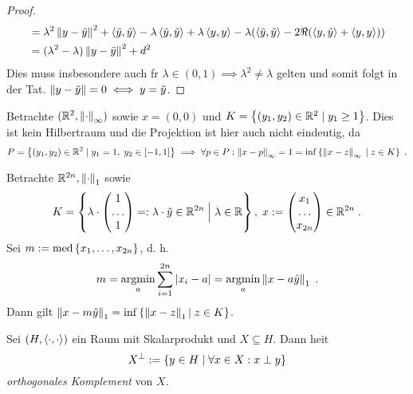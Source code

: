 \begin{proof}
\begin{align*}
	&= \lambda^2 \left\lVert y-\tilde y\right\rVert^2 + \left\langle\tilde y, \tilde y\right\rangle - \lambda \left\langle\tilde y, \tilde y\right\rangle + \lambda \left\langle y, y\right\rangle - \lambda (\left\langle\tilde y, \tilde y\right\rangle -2 \Re(\left\langle y,\tilde y\right\rangle + \left\langle y,y\right\rangle)) \\
	& = (\lambda^2 - \lambda) \left\lVert y-\tilde y\right\rVert^2 + d^2 
	\end{align*}
	Dies muss insbesondere auch f\us r \(\lambda \in (0,1) \implies \lambda^2 \neq \lambda\) gelten und somit folgt in der Tat. \(\left\lVert y-\tilde y\right\rVert = 0 \iff y = \tilde y\).
	\end{proof}
	
	\begin{ex}
		Betrachte \((\mathbb{R}^2, \left\lVert\cdot\right\rVert_\infty)\) sowie \(x = (0,0)\) und \(K = \left\{(y_1, y_2) \in \mathbb{R}^2\;\vert\; y_1 \geq 1\right\}\). Dies ist kein Hilbertraum und die Projektion ist hier auch nicht eindeutig, da 
		\[P = \left\{(y_1, y_2) \in \mathbb{R}^2\;\vert\; y_1 = 1,\; y_2 \in [-1,1]\right\} \implies \forall p \in P: \left\lVert x-p\right\rVert_\infty = 1 = \inf\left\{\left\lVert x-z\right\rVert_\infty \;\vert\; z \in K\right\}\;.\]
	\end{ex}
	
	\begin{ex}
		Betrachte \(\mathbb{R}^{2n},\left\lVert\cdot\right\rVert_{1}\) sowie \[K = \left\{\lambda \cdot \begin{pmatrix}1\\ \ldots\\1 \end{pmatrix} =: \lambda \cdot \hat y\in \mathbb{R}^{2n} \;\Big\vert\; \lambda \in \mathbb{R}\right\},\; x : = \begin{pmatrix}x_1\\ \ldots\\ x_{2n}\end{pmatrix} \in \mathbb{R}^{2n}\;.\] 
		Sei \(m : = \text{med}\left\{x_1,\ldots,x_{2n}\right\}\), d. h. 
		\[m = \underset{a}{\text{argmin}} \sum_{i=1}^{2n}\left\lvert x_i -a \right\rvert =  \underset{a}{\text{argmin}} \left\lVert x -a \hat y\right\rVert_{1}\;.\]
		Dann gilt  \(\left\lVert x-m \hat y\right\rVert_{1} = \inf\left\{\left\lVert x-z\right\rVert_{1}\vert \; z\in K\right\}\).
	\end{ex}
	
	\begin{definition}
		Sei \((H, \left\langle\cdot, \cdot\right\rangle)\) ein Raum mit Skalarprodukt und \(X\subseteq H\). Dann  hei\s t
		\[X^\perp := \left\{y\in H \;\vert\; \forall x \in X: x \perp y\right\}\]
		\textit{orthogonales Komplement} von $X$.
	\end{definition}
	
